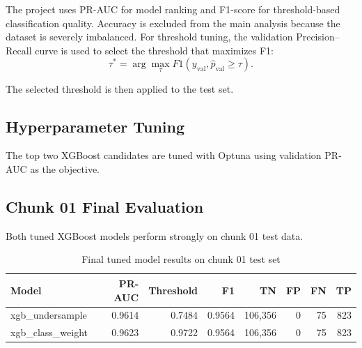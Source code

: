\documentclass[12pt,a4paper]{article}
\begin{document}
The project uses PR-AUC for model ranking and F1-score for threshold-based classification quality. Accuracy is excluded from the main analysis because the dataset is severely imbalanced. For threshold tuning, the validation Precision--Recall curve is used to select the threshold that maximizes F1:
\begin{equation}
    \tau^* = \arg\max_{\tau} F1(y_{\text{val}}, \hat{p}_{\text{val}} \ge \tau).
\end{equation}

The selected threshold is then applied to the test set.

\subsection{Hyperparameter Tuning}

The top two XGBoost candidates are tuned with Optuna using validation PR-AUC as the objective.

\begin{table}[H]
\centering
\caption{Best tuned XGBoost hyperparameters}
\end{table}

\subsection{Chunk 01 Final Evaluation}

Both tuned XGBoost models perform strongly on chunk 01 test data.

\begin{table}[H]
\centering
\caption{Final tuned model results on chunk 01 test set}
\begin{tabular}{lrrrrrrr}
\toprule
\textbf{Model} & \textbf{PR-AUC} & \textbf{Threshold} & \textbf{F1} & \textbf{TN} & \textbf{FP} & \textbf{FN} & \textbf{TP} \\
\midrule
xgb\_undersample & 0.9614 & 0.7484 & 0.9564 & 106,356 & 0 & 75 & 823 \\
xgb\_class\_weight & 0.9623 & 0.9722 & 0.9564 & 106,356 & 0 & 75 & 823 \\
\bottomrule
\end{tabular}
\end{table}
\end{document}
